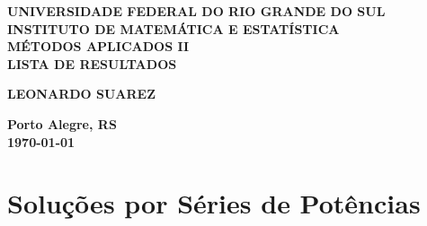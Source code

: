 \documentclass[12pt]{article}
\theoremstyle{plain}
\theoremstyle{definition}
\theoremstyle{remark}
\begin{document}
\begin{center}
    \textbf{\large UNIVERSIDADE FEDERAL DO RIO GRANDE DO SUL} \\
    \textbf{\large INSTITUTO DE MATEMÁTICA E ESTATÍSTICA} \\
    \vspace{3cm}
    \textbf{\Large MÉTODOS APLICADOS II} \\
    \vspace{1cm}
    \textbf{\large LISTA DE RESULTADOS} \\
    \vspace{3cm}

    \textbf{LEONARDO SUAREZ}

    \vfill
    \textbf{\large Porto Alegre, RS} \\
    \textbf{\large \today}
\end{center}

\newpage
\tableofcontents
\newpage

\section{Soluções por Séries de Potências}
\end{document}
